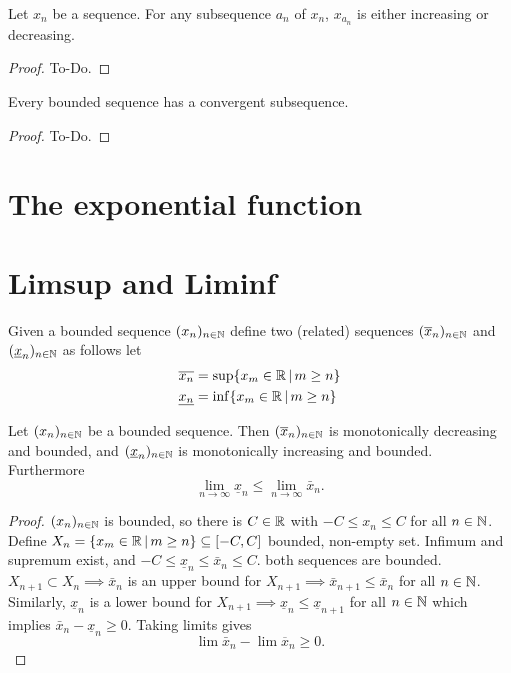 \begin{lemma}\label{lem:subseqmonoincordec}
    Let $x_n$ be a sequence.
    For any subsequence $a_n$ of $x_n$,
    $x_{a_n}$ is either increasing or decreasing.
\end{lemma}
\begin{proof}
    To-Do.
\end{proof}

\begin{theorem}\label{thm:seq_bolzanoweierstrass}
     \leanok
    Every bounded sequence has a convergent subsequence.
\end{theorem}
\begin{proof}
    To-Do.
\end{proof}

\section{The exponential function}

\section{Limsup and Liminf}
Given a bounded sequence $\seq$ define two
(related)
sequences $\seq[\overline{x}]$ and $\seq[\underline{x}]$ as follows let
\begin{align*}
    \overline{x_n} &= \sup\{x_m \in \R\,|\,m \geq n\} \\
    \underline{x_n} &= \inf\{x_m \in \R\,|\,m \geq n\}
\end{align*}

\begin{lemma}\label{lem:limsup_liminf}
    Let $\seq$ be a bounded sequence.
    Then $\seq[\overline{x}]$ is monotonically decreasing and bounded,
    and $\seq[\underline{x}]$ is monotonically increasing and bounded.
    Furthermore
    \[
    \lim_{n \to \infty}\underline{x}_n \leq \lim_{n \to \infty}\bar{x}_n.
    \]
\end{lemma}
\begin{proof}
    $\seq$ is bounded,
    so there is $C \in \R$ with $-C \leq x_n \leq C$ for all $n \in \N$.
    Define $X_n = \{x_m \in \R\,|\, m \geq n\} \subseteq [-C, C]$ bounded,
    non-empty set.
    Infimum and supremum exist,
    and $-C \leq \underline{x}_n \leq \bar{x}_n \leq C$.
    both sequences are bounded.
    $X_{n + 1} \subset X_n \implies \bar{x}_n$ is an upper bound for $X_{n + 1} \implies \bar{x}_{n + 1} \leq \bar{x}_n$ for all $n \in \N$.
    Similarly,
    $\underline{x}_n$ is a lower bound for $X_{n + 1} \implies \underline{x}_n \leq \underline{x}_{n + 1}$ for all $n \in \N$ which implies $\bar{x}_n - \underline{x}_n \geq 0$.
    Taking limits gives
    \[
    \lim\bar{x}_n - \lim\overline{x}_n \geq 0.
    \]
\end{proof}

